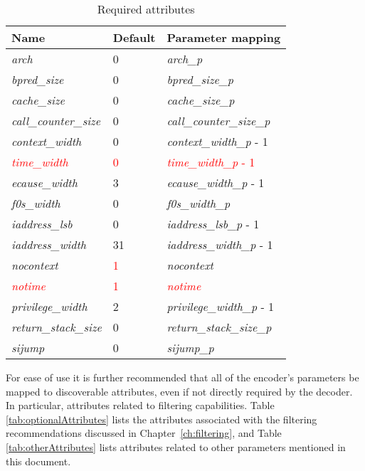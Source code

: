 \begin{table}[!h]
    \centering
    \caption{Required attributes}
    \label{tab:requiredAttributes}
    \begin{tabulary}{\textwidth}{|l|l|p{80mm}|}
        \hline
        \textbf{Name} & \textbf{Default} & \textbf{Parameter mapping} \\
        \hline
        \textit{arch} & 0 & \textit{arch\_p} \\
        \hline
        \textit{bpred\_size} & 0 & \textit{bpred\_size\_p}  \\
        \hline
        \textit{cache\_size} & 0 & \textit{cache\_size\_p} \\
        \hline
        \textit{call\_counter\_size} & 0 & \textit{call\_counter\_size\_p} \\
        \hline
        \textit{context\_width} & 0 & \textit{context\_width\_p} - 1 \\
        \hline
        \textcolor{red}{\textit{time\_width}} & \textcolor{red}{0} & \textcolor{red}{\textit{time\_width\_p} - 1} \\
        \hline
        \textit{ecause\_width} & 3 & \textit{ecause\_width\_p} - 1 \\
        \hline
        \textit{f0s\_width} & 0 & \textit{f0s\_width\_p} \\
        \hline
        \textit{iaddress\_lsb} & 0 & \textit{iaddress\_lsb\_p} - 1 \\
        \hline
        \textit{iaddress\_width} & 31 & \textit{iaddress\_width\_p} - 1 \\
        \hline
        \textit{nocontext} & \textcolor{red}{1} & \textit{nocontext} \\
        \hline
        \textcolor{red}{\textit{notime}} & \textcolor{red}{1} & \textcolor{red}{\textit{notime}} \\
        \hline
        \textit{privilege\_width} & 2 & \textit{privilege\_width\_p} - 1 \\
        \hline
        \textit{return\_stack\_size} & 0 & \textit{return\_stack\_size\_p} \\
        \hline
        \textit{sijump} & 0 & \textit{sijump\_p} \\
        \hline
    \end{tabulary}
\end{table}

For ease of use it is further recommended that all of the encoder's parameters be mapped to 
discoverable attributes, even if not directly required by the decoder.  In particular, 
attributes related to filtering capabilities.  Table \ref{tab:optionalAttributes} lists the attributes
associated with the filtering recommendations discussed in Chapter~\ref{ch:filtering}, and 
Table \ref{tab:otherAttributes} lists attributes related to other parameters mentioned in this 
document.

